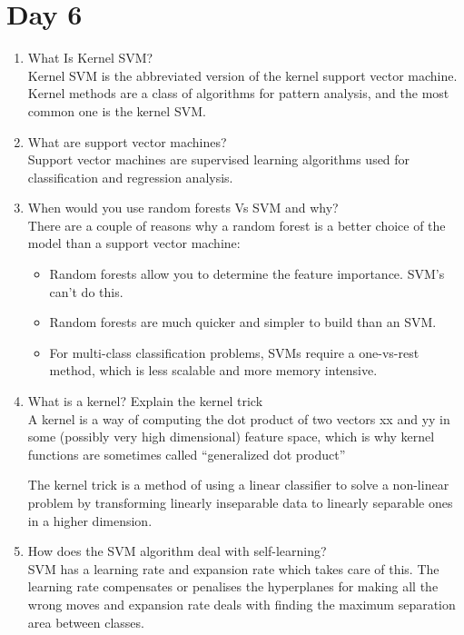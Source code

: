 \documentclass[11pt]{article}
\begin{document}
\section{Day 6}
\begin{enumerate}
\item What Is Kernel SVM?\\[.5em]
Kernel SVM is the abbreviated version of the kernel support vector machine. Kernel methods
are a class of algorithms for pattern analysis, and the most common one is the kernel SVM.

\item What are support vector machines?\\[.5em]
Support vector machines are supervised learning algorithms used for classification and
regression analysis.

\item When would you use random forests Vs SVM and why?\\[.5em]
There are a couple of reasons why a random forest is a better choice of the model than a
support vector machine:
\begin{itemize}
\item Random forests allow you to determine the feature importance. SVM’s can't do this.
\item Random forests are much quicker and simpler to build than an SVM.
\item For multi-class classification problems, SVMs require a one-vs-rest method, which is
less scalable and more memory intensive.
\end{itemize}

\item What is a kernel? Explain the kernel trick\\[.5em]
A kernel is a way of computing the dot product of two vectors xx and yy in some (possibly very
high dimensional) feature space, which is why kernel functions are sometimes called
“generalized dot product”

The kernel trick is a method of using a linear classifier to solve a non-linear problem by
transforming linearly inseparable data to linearly separable ones in a higher dimension.

\item How does the SVM algorithm deal with self-learning?\\[.5em]
SVM has a learning rate and expansion rate which takes care of this. The learning rate
compensates or penalises the hyperplanes for making all the wrong moves and expansion rate
deals with finding the maximum separation area between classes.
\end{enumerate}
\pagebreak
\end{document}
